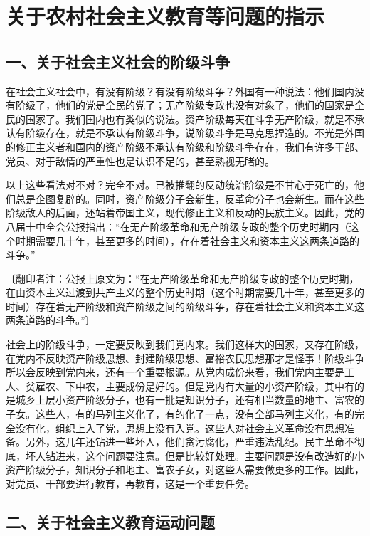 \section[关于农村社会主义教育等问题的指示（一九六三年五月）]{关于农村社会主义教育等问题的指示}


\subsection{一、关于社会主义社会的阶级斗争}

在社会主义社会中，有没有阶级？有没有阶级斗争？外国有一种说法：他们国内没有阶级了，他们的党是全民的党了；无产阶级专政也没有对象了，他们的国家是全民的国家了。我们国内也有类似的说法。资产阶级每天在斗争无产阶级，就是不承认有阶级存在，就是不承认有阶级斗争，说阶级斗争是马克思捏造的。不光是外国的修正主义者和国内的资产阶级不承认有阶级和阶级斗争存在，我们有许多干部、党员、对于敌情的严重性也是认识不足的，甚至熟视无睹的。

以上这些看法对不对？完全不对。已被推翻的反动统治阶级是不甘心于死亡的，他们总是企图复辟的。同时，资产阶级分子会新生，反革命分子也会新生。而在这些阶级敌人的后面，还站着帝国主义，现代修正主义和反动的民族主义。因此，党的八届十中全会公报指出：“在无产阶级革命和无产阶级专政的整个历史时期内（这个时期需要几十年，甚至更多的时间），存在着社会主义和资本主义这两条道路的斗争。”

〔翻印者注：公报上原文为：“在无产阶级革命和无产阶级专政的整个历史时期，在由资本主义过渡到共产主义的整个历史时期（这个时期需要几十年，甚至更多的时间）存在着无产阶级和资产阶级之间的阶级斗争，存在着社会主义和资本主义这两条道路的斗争。”〕

社会上的阶级斗争，一定要反映到我们党内来。我们这样大的国家，又存在阶级，在党内不反映资产阶级思想、封建阶级思想、富裕农民思想那才是怪事！阶级斗争所以会反映到党内来，还有一个重要根源。从党内成份来看，我们党内主要是工人、贫雇农、下中农，主要成份是好的。但是党内有大量的小资产阶级，其中有的是城乡上层小资产阶级分子，也有一批是知识分子，还有相当数量的地主、富农的子女。这些人，有的马列主义化了，有的化了一点，没有全部马列主义化，有的完全没有化，组织上入了党，思想上没有入党。这些人对社会主义革命没有思想准备。另外，这几年还钻进一些坏人，他们贪污腐化，严重违法乱纪。民主革命不彻底，坏人钻进来，这个问题要注意。但是比较好处理。主要问题是没有改造好的小资产阶级分子，知识分子和地主、富农子女，对这些人需要做更多的工作。因此，对党员、干部要进行教育，再教育，这是一个重要任务。

\subsection{二、关于社会主义教育运动问题}

